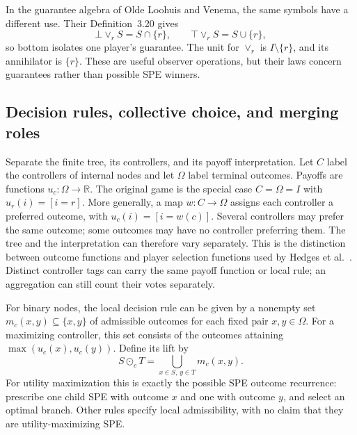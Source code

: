 In the guarantee algebra of Olde Loohuis and Venema, the same symbols
have a different use. Their Definition~3.20
\cite{OldeLoohuisVenema2010} gives
\[
 \bot\vee_r S=S\cap\{r\},\qquad
 \top\vee_r S=S\cup\{r\},
\]
so bottom isolates one player's guarantee. The unit for $\vee_r$ is
$I\setminus\{r\}$, and its annihilator is $\{r\}$. These are useful
observer operations, but their laws concern guarantees rather than
possible SPE winners.

\subsection{Decision rules, collective choice, and merging roles}\label{app:contexts-collective}

Separate the finite tree, its controllers, and its payoff interpretation.
Let $C$ label the controllers of internal nodes and let $\Omega$ label
terminal outcomes. Payoffs are functions $u_c:\Omega\to\mathbb R$.
The original game is the special case $C=\Omega=I$ with
$u_r(i)=[i=r]$. More generally, a map $w:C\to\Omega$ assigns each
controller a preferred outcome, with $u_c(i)=[i=w(c)]$. Several
controllers may prefer the same outcome; some outcomes may have no
controller preferring them. The tree and the interpretation can
therefore vary separately. This is the distinction between outcome
functions and player selection functions used by Hedges et al.\
\cite[Definitions~1, 3 and 7]{HedgesEtAl2017Selection}.
Distinct controller tags can carry the same payoff function or local
rule; an aggregation can still count their votes separately.

For binary nodes, the local decision rule can be given by a nonempty
set $m_c(x,y)\subseteq\{x,y\}$ of admissible outcomes for each fixed
pair $x,y\in\Omega$. For a maximizing controller, this set consists
of the outcomes attaining $\max(u_c(x),u_c(y))$. Define its lift by
\begin{equation}\label{context:eq:rule-lift}
 S\mathbin{\odot_c}T=\bigcup_{x\in S,\,y\in T}m_c(x,y).
\end{equation}
For utility maximization this is exactly the possible SPE outcome
recurrence: prescribe one child SPE with outcome $x$ and one with
outcome $y$, and select an optimal branch. Other rules specify local
admissibility, with no claim that they are utility-maximizing SPE.

